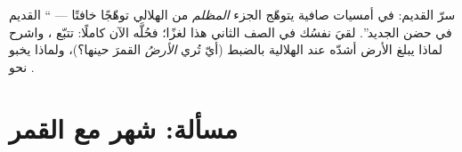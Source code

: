 \begin{exercise}[$\star\star\star$]\label{exo:g7:moon-phases:12}
سرّ  القديم: في أمسيات صافية يتوهّج الجزء \emph{المظلم}
من  الهلالي توهّجًا خافتًا --- `` القديم في حضن 
الجديد''. لقيَ نفسُك في الصف الثاني هذا لغزًا؛ فحُلَّه الآن
كاملًا: تتبّع  ، واشرح لماذا يبلغ  الأرض أشدّه عند
 الهلالية بالضبط (أيّ  تُري \emph{الأرضُ} القمرَ
حينها؟)، ولماذا يخبو نحو .
\end{exercise}

\section{مسألة: شهر مع القمر}

